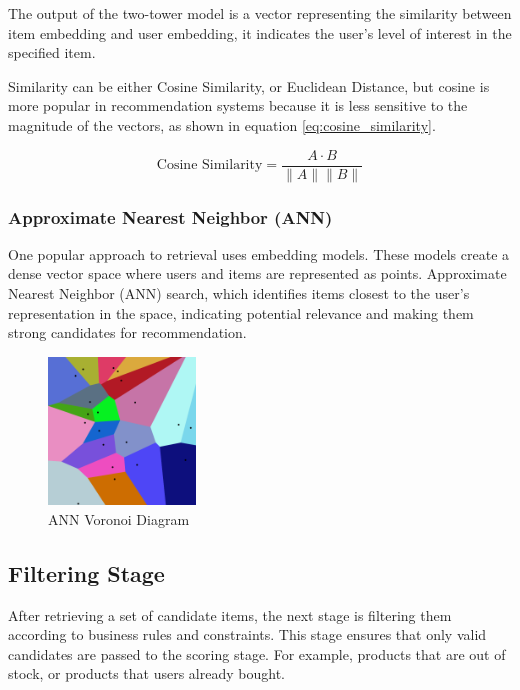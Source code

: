 The output of the two-tower model is a vector representing the similarity between item embedding and user embedding, 
it indicates the user's level of interest in the specified item.

Similarity can be either Cosine Similarity, or Euclidean Distance, but cosine is more popular in recommendation systems because it is less sensitive to the magnitude of the vectors, as shown in equation \ref{eq:cosine_similarity}.

\begin{equation}
    \text{Cosine Similarity} = \frac{A \cdot B}{\|A\| \|B\|}
    \label{eq:cosine_similarity}
\end{equation}


\subsubsection{Approximate Nearest Neighbor (ANN)}

One popular approach to retrieval uses embedding models. 
These models create a dense vector space where users and items are represented as points.
Approximate Nearest Neighbor (ANN) search,
which identifies items closest to the user's representation in the space, 
indicating potential relevance and making them strong candidates for recommendation.


\begin{figure}[H]
    \centering
    \includegraphics[width=0.35\textwidth]{assets/ann.png}
    \caption[ANN Voronoi Diagram]{ANN Voronoi Diagram \cite{AnnVoronoi}}
    \label{fig:AnnVoronoi}
\end{figure}


\subsection{Filtering Stage}

After retrieving a set of candidate items, the next stage is filtering them according to business rules and constraints.
This stage ensures that only valid candidates are passed to the scoring stage.
For example, products that are out of stock, or products that users already bought.

